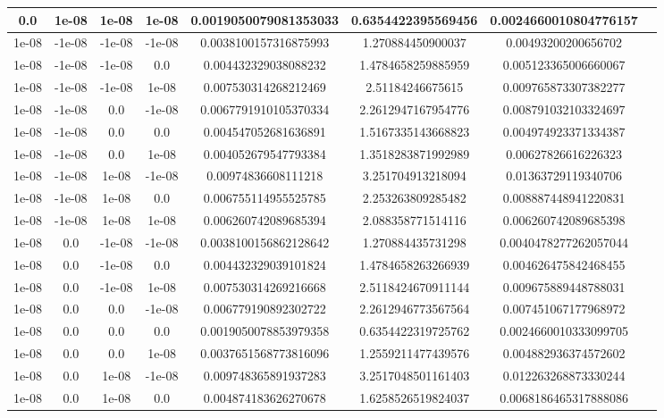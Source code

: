 \documentclass[a4paper]{article}
\begin{document}
\begin{center}
\begin{longtable}{@{}c|@{}c|@{}c|@{}c|@{}c|@{}c|@{}cX@{}}
		0.0 & 1e-08 & 1e-08 & 1e-08 & 0.0019050079081353033& 0.6354422395569456& 0.0024660010804776157\\ \hline
		1e-08 & -1e-08 & -1e-08 & -1e-08 & 0.0038100157316875993& 1.270884450900037& 0.00493200200656702\\ \hline
		1e-08 & -1e-08 & -1e-08 & 0.0& 0.004432329038088232& 1.4784658259885959& 0.005123365006660067\\ \hline
		1e-08 & -1e-08 & -1e-08 & 1e-08 & 0.007530314268212469& 2.51184246675615& 0.009765873307382277\\ \hline
		1e-08 & -1e-08 & 0.0 & -1e-08 & 0.0067791910105370334& 2.2612947167954776& 0.008791032103324697\\ \hline
		1e-08 & -1e-08 & 0.0 & 0.0& 0.004547052681636891& 1.5167335143668823& 0.004974923371334387\\ \hline
		1e-08 & -1e-08 & 0.0 & 1e-08 & 0.004052679547793384& 1.3518283871992989& 0.00627826616226323\\ \hline
		1e-08 & -1e-08 & 1e-08 & -1e-08 & 0.00974836608111218& 3.251704913218094& 0.01363729119340706\\ \hline
		1e-08 & -1e-08 & 1e-08 & 0.0& 0.006755114955525785& 2.253263809285482& 0.008887448941220831\\ \hline
		1e-08 & -1e-08 & 1e-08 & 1e-08 & 0.006260742089685394& 2.088358771514116& 0.006260742089685398\\ \hline
		1e-08 & 0.0 & -1e-08 & -1e-08 & 0.0038100156862128642& 1.270884435731298& 0.0040478277262057044\\ \hline
		1e-08 & 0.0 & -1e-08 & 0.0& 0.004432329039101824& 1.4784658263266939& 0.004626475842468455\\ \hline
		1e-08 & 0.0 & -1e-08 & 1e-08 & 0.007530314269216668& 2.5118424670911144& 0.009675889448788031\\ \hline
		1e-08 & 0.0 & 0.0 & -1e-08 & 0.006779190892302722& 2.2612946773567564& 0.007451067177968972\\ \hline
		1e-08 & 0.0 & 0.0 & 0.0& 0.0019050078853979358& 0.6354422319725762& 0.0024660010333099705\\ \hline
		1e-08 & 0.0 & 0.0 & 1e-08 & 0.0037651568773816096& 1.2559211477439576& 0.004882936374572602\\ \hline
		1e-08 & 0.0 & 1e-08 & -1e-08 & 0.009748365891937283& 3.2517048501161403& 0.012263268873330244\\ \hline
		1e-08 & 0.0 & 1e-08 & 0.0& 0.004874183626270678& 1.6258526519824037& 0.0068186465317888086\\ \hline

\end{longtable}
\end{center}
\end{document}
